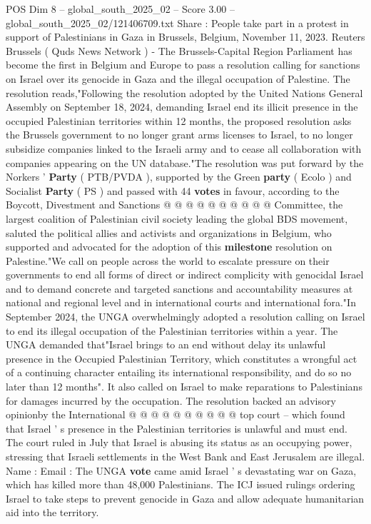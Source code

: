 \begin{textsample}{POS Dim 8 – global\_south\_2025\_02 – Score 3.00 – global\_south\_2025\_02/121406709.txt}  \label{ex:f8_pos_394}
Share : People take part in a protest in support of Palestinians in Gaza in Brussels, Belgium, November 11, 2023.
Reuters Brussels ( Quds News Network ) - The Brussels-Capital Region Parliament has become the first in Belgium and Europe to pass a resolution calling for sanctions on Israel over its genocide in Gaza and the illegal occupation of Palestine.
The resolution reads,"Following the resolution adopted by the United Nations General Assembly on September 18, 2024, demanding Israel end its illicit presence in the occupied Palestinian territories within 12 months, the proposed resolution asks the Brussels government to no longer grant arms licenses to Israel, to no longer subsidize companies linked to the Israeli army and to cease all collaboration with companies appearing on the UN database."The resolution was put forward by the Norkers ' \textbf{Party} ( PTB/PVDA ), supported by the Green \textbf{party} ( Ecolo ) and Socialist \textbf{Party} ( PS ) and passed with 44 \textbf{votes} in favour, according to the Boycott, Divestment and Sanctions @ @ @ @ @ @ @ @ @ @ Committee, the largest coalition of Palestinian civil society leading the global BDS movement, saluted the political allies and activists and organizations in Belgium, who supported and advocated for the adoption of this \textbf{milestone} resolution on Palestine."We call on people across the world to escalate pressure on their governments to end all forms of direct or indirect complicity with genocidal Israel and to demand concrete and targeted sanctions and accountability measures at national and regional level and in international courts and international fora."In September 2024, the UNGA overwhelmingly adopted a resolution calling on Israel to end its illegal occupation of the Palestinian territories within a year.
The UNGA demanded that"Israel brings to an end without delay its unlawful presence in the Occupied Palestinian Territory, which constitutes a wrongful act of a continuing character entailing its international responsibility, and do so no later than 12 months".
It also called on Israel to make reparations to Palestinians for damages incurred by the occupation.
The resolution backed an advisory opinionby the International @ @ @ @ @ @ @ @ @ @ top court -- which found that Israel ' s presence in the Palestinian territories is unlawful and must end.
The court ruled in July that Israel is abusing its status as an occupying power, stressing that Israeli settlements in the West Bank and East Jerusalem are illegal.
Name : Email : The UNGA \textbf{vote} came amid Israel ' s devastating war on Gaza, which has killed more than 48,000 Palestinians.
The ICJ issued rulings ordering Israel to take steps to prevent genocide in Gaza and allow adequate humanitarian aid into the territory.

\end{textsample}
